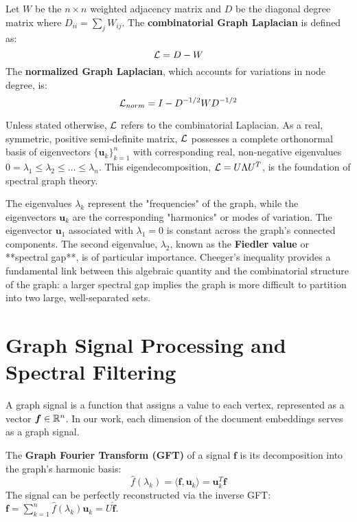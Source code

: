 \begin{definition}
Let $W$ be the $n \times n$ weighted adjacency matrix and $D$ be the diagonal degree matrix where $D_{ii} = \sum_j W_{ij}$. The \textbf{combinatorial Graph Laplacian} is defined as:
\begin{equation}
    \mathcal{L} = D - W
\end{equation}
The \textbf{normalized Graph Laplacian}, which accounts for variations in node degree, is:
\begin{equation}
    \mathcal{L}_{norm} = I - D^{-1/2} W D^{-1/2}
\end{equation}
\end{definition}
Unless stated otherwise, $\mathcal{L}$ refers to the combinatorial Laplacian. As a real, symmetric, positive semi-definite matrix, $\mathcal{L}$ possesses a complete orthonormal basis of eigenvectors $\{\bm{u}_k\}_{k=1}^n$ with corresponding real, non-negative eigenvalues $0 = \lambda_1 \le \lambda_2 \le \dots \le \lambda_n$. This eigendecomposition, $\mathcal{L} = U \Lambda U^T$, is the foundation of spectral graph theory.

The eigenvalues $\lambda_k$ represent the "frequencies" of the graph, while the eigenvectors $\bm{u}_k$ are the corresponding "harmonics" or modes of variation. The eigenvector $\bm{u}_1$ associated with $\lambda_1=0$ is constant across the graph's connected components. The second eigenvalue, $\lambda_2$, known as the \textbf{Fiedler value} or **spectral gap**, is of particular importance. Cheeger's inequality provides a fundamental link between this algebraic quantity and the combinatorial structure of the graph: a larger spectral gap implies the graph is more difficult to partition into two large, well-separated sets.

\section{Graph Signal Processing and Spectral Filtering}
A graph signal is a function that assigns a value to each vertex, represented as a vector $\bm{f} \in \mathbb{R}^n$. In our work, each dimension of the document embeddings serves as a graph signal.

\begin{definition}
The \textbf{Graph Fourier Transform (GFT)} of a signal $\bm{f}$ is its decomposition into the graph's harmonic basis:
\begin{equation}
    \hat{f}(\lambda_k) = \langle \bm{f}, \bm{u}_k \rangle = \bm{u}_k^T \bm{f}
\end{equation}
The signal can be perfectly reconstructed via the inverse GFT: $\bm{f} = \sum_{k=1}^n \hat{f}(\lambda_k) \bm{u}_k = U \hat{\bm{f}}$.
\end{definition}

